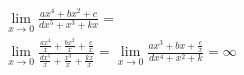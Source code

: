 \begin{ex}
\begin{align}
&\lim_{x\rightarrow 0} \frac{ax^4+bx^2+c}{dx^5+x^3+kx}=\nonumber\\
&\lim_{x\rightarrow 0} \frac{\frac{ax^4}{x}+\frac{bx^2}{x}+\frac{c}{x}}{\frac{dx^5}{x}+\frac{x^3}{x}+\frac{kx}{x}}=\lim_{x\rightarrow 0} \frac{ax^3+bx+\frac{c}{x}}{dx^4+x^2+k}=\infty\nonumber
\end{align}
\end{ex}